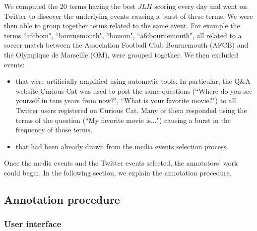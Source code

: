 We computed the 20 terms having the best $JLH$ scoring every day and went on Twitter to discover the underlying events causing a burst of these terms. We were then able to group together terms related to the same event. For example the terms ``afcbom", ``bournemouth", ``bouom", ``afcbournemouth", all related to a soccer match between the Association Football Club Bournemouth (AFCB) and the Olympique de Marseille (OM), were grouped together. We then excluded events:
\begin{itemize}
\item that were artificially amplified using automatic tools. In particular, the Q\&A website Curious Cat was used to post the same questions (``Where do you see yourself in tens years from now?", ``What is your favorite movie?") to all Twitter users registered on Curious Cat. Many of them responded using the terms of the question (``My favorite movie is...") causing a burst in the frequency of those terms.
\item that had been already drawn from the media events selection process.
\end{itemize}

Once the media events and the Twitter events selected, the annotators' work could begin. In the following section, we explain the annotation procedure.
		\subsection{Annotation procedure}
		\subsubsection{User interface}
		
